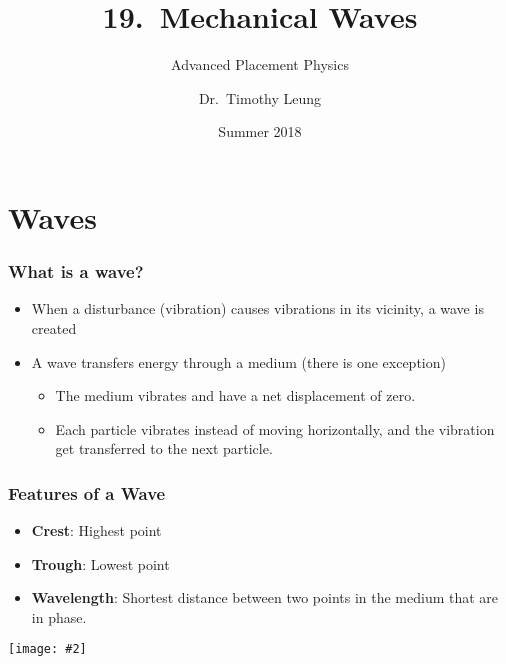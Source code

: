 \documentclass[12pt,aspectratio=169]{beamer}
\title[Waves]{19.\ Mechanical Waves}
\subtitle{Advanced Placement Physics}
\author[TML]{Dr.\ Timothy Leung}
\institute{Olympiads School}
\date{Summer 2018}
\newcommand{\pic}[2]{\texttt{[image: \#2]}}
\begin{document}
\begin{frame}
  \titlepage
\end{frame}



\section{Waves}
\begin{frame}
  \frametitle{What is a wave?}
  \begin{itemize}
  \item When a disturbance (vibration) causes vibrations in its vicinity, a
    wave is created
  \item A wave transfers energy through a medium (there is one exception)
    \begin{itemize}
    \item The medium vibrates and have a net displacement of zero.
    \item Each particle vibrates instead of moving horizontally, and the
      vibration get transferred to the next particle.
    \end{itemize}
  \end{itemize}
\end{frame}



\begin{frame}
  \frametitle{Features of a Wave}
  \begin{itemize}
  \item\textbf{Crest}: Highest point
  \item\textbf{Trough}: Lowest point
  \item\textbf{Wavelength}: Shortest distance between two points in the medium
    that are in phase.
  \end{itemize}
  \begin{center}
    \vspace{-.5in}
    \pic{.8}{sine-wave1.png}
  \end{center}
  
  \vspace{-.3in}{\footnotesize(The easiest way to measure wavelength is from
    crest to crest, or from trough to trough.)\par}
\end{frame}
\end{document}
